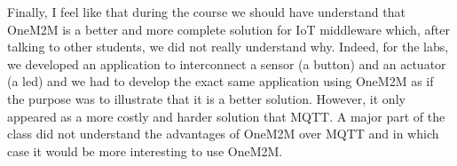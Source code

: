 Finally, I feel like that during the course we should have understand that OneM2M is a better and more complete solution for IoT middleware which, after talking to other students, we did not really understand why. Indeed, for the labs, we developed an application to interconnect a sensor (a button) and an actuator (a led) and we had to develop the exact same application using OneM2M as if the purpose was to illustrate that it is a better solution. However, it only appeared as a more costly and harder solution that MQTT. A major part of the class did not understand the advantages of OneM2M over MQTT and in which case it would be more interesting to use OneM2M. 